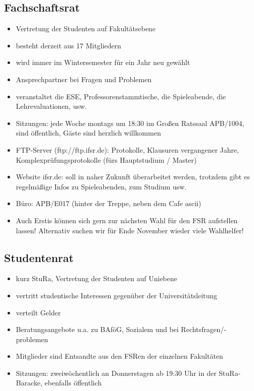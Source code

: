 \documentclass[a4paper,12pt]{report}
\begin{document}
\subsection{Fachschaftsrat}
\begin{itemize}
	\item Vertretung der Studenten auf Fakultätsebene
	\item besteht derzeit aus 17 Mitgliedern
	\item wird immer im Wintersemester für ein Jahr neu gewählt
	\item Ansprechpartner bei Fragen und Problemen
	\item veranstaltet die ESE, Professorenstammtische, die Spieleabende, die Lehrevaluationen, usw.
	\item Sitzungen: jede Woche montags um 18:30 im Großen Ratssaal APB/1004, sind öffentlich, Gäste sind herzlich willkommen
	\item FTP-Server (ftp://ftp.ifsr.de): Protokolle, Klausuren vergangener Jahre, Komplexprüfungsprotokolle (fürs Hauptstudium / Master)
	\item Website ifsr.de: soll in naher Zukunft überarbeitet werden, trotzdem gibt es regelmäßige Infos zu Spieleabenden, zum Studium usw.
	\item Büro: APB/E017 (hinter der Treppe, neben dem Cafe ascii)
	\item Auch Erstis können sich gern zur nächsten Wahl für den FSR aufstellen lassen! Alternativ suchen wir für Ende November wieder viele Wahlhelfer!
\end{itemize}

\subsection{Studentenrat}
\begin{itemize}
	\item kurz StuRa, Vertretung der Studenten auf Uniebene
	\item vertritt studentische Interessen gegenüber der Universitätsleitung
	\item verteilt Gelder
	\item Beratungsangebote u.a. zu BAföG, Sozialem und bei Rechtsfragen/-problemen
	\item Mitglieder sind Entsandte aus den FSRen der einzelnen Fakultäten
	\item Sitzungen: zweiwöchentlich an Donnerstagen ab 19:30 Uhr in der StuRa-Baracke, ebenfalls öffentlich
\end{itemize}
\end{document}
